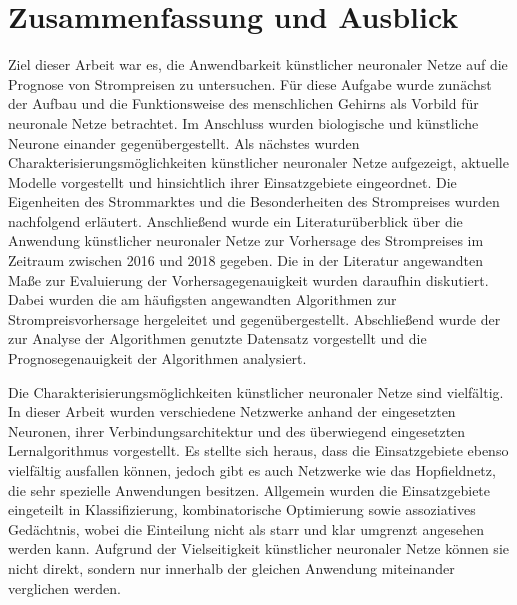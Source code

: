 

\section{Zusammenfassung und Ausblick} 

\begin{sloppypar}
Ziel dieser Arbeit war es, die Anwendbarkeit künstlicher neuronaler Netze auf die Prognose von Strompreisen zu untersuchen. Für diese Aufgabe wurde zunächst der Aufbau und die Funktionsweise des menschlichen Gehirns als Vorbild für neuronale Netze betrachtet. Im Anschluss wurden biologische und künstliche Neurone einander gegenübergestellt. Als nächstes wurden Charakterisierungsmöglichkeiten künstlicher neuronaler Netze aufgezeigt, aktuelle Modelle vorgestellt und hinsichtlich ihrer Einsatzgebiete eingeordnet. Die Eigenheiten des Strommarktes und die Besonderheiten des Strompreises wurden nachfolgend erläutert. Anschließend wurde ein Literaturüberblick über die Anwendung künstlicher neuronaler Netze zur Vorhersage des Strompreises im Zeitraum zwischen 2016 und 2018 gegeben. Die in der Literatur angewandten Maße zur Evaluierung der Vorhersagegenauigkeit wurden daraufhin diskutiert. Dabei wurden die am häufigsten angewandten Algorithmen zur Strompreisvorhersage hergeleitet und gegenübergestellt. Abschließend wurde der zur Analyse der Algorithmen genutzte Datensatz vorgestellt und die Prognosegenauigkeit der Algorithmen analysiert.\par\medskip 

Die Charakterisierungsmöglichkeiten künstlicher neuronaler Netze sind vielfältig. In dieser Arbeit wurden verschiedene Netzwerke anhand der eingesetzten Neuronen, ihrer Verbindungsarchitektur und des überwiegend eingesetzten Lernalgorithmus vorgestellt. Es stellte sich heraus, dass die Einsatzgebiete ebenso vielfältig ausfallen können, jedoch gibt es auch Netzwerke wie das Hopfieldnetz, die sehr spezielle Anwendungen besitzen. Allgemein wurden die Einsatzgebiete eingeteilt in Klassifizierung, kombinatorische Optimierung sowie assoziatives Gedächtnis, wobei die Einteilung nicht als starr und klar umgrenzt angesehen werden kann. Aufgrund der Vielseitigkeit künstlicher neuronaler Netze können sie nicht direkt, sondern nur innerhalb der gleichen Anwendung miteinander verglichen werden. %
\par\medskip 


\end{sloppypar}
